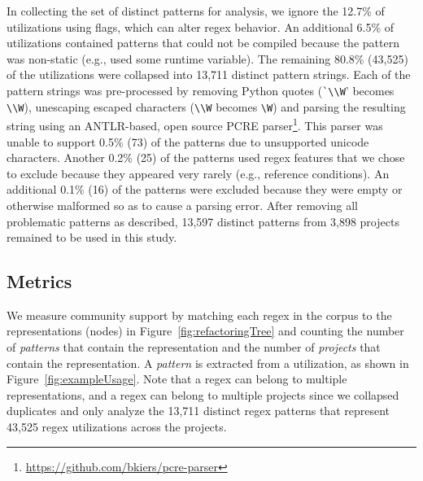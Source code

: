 In collecting the set of distinct patterns for analysis,  we ignore the 12.7\%  of utilizations using flags, which can alter regex behavior.  An additional 6.5\% of utilizations contained patterns that could not be compiled because the pattern was non-static (e.g., used some runtime variable).
The remaining 80.8\% (43,525) of the utilizations were collapsed into 13,711 distinct pattern strings.  Each of the pattern strings was pre-processed by removing Python quotes (\verb!`\\W!' becomes \verb!\\W!), unescaping escaped characters (\verb!\\W! becomes \verb!\W!) and parsing the resulting  string using an ANTLR-based, open source PCRE parser\footnote{\url{https://github.com/bkiers/pcre-parser}}.
This parser was unable to support 0.5\% (73) of the patterns due to unsupported unicode characters.  Another 0.2\% (25) of the patterns used regex features that we  chose to exclude because they appeared very rarely (e.g., reference conditions).  An additional 0.1\% (16) of the patterns were excluded because they were empty or otherwise malformed so as to cause a parsing error.  After removing all problematic patterns as described, 13,597 distinct patterns from 3,898 projects remained to be used in this study.



\subsection{Metrics}
\label{sec:communitymetric}
We measure community support by matching each regex in the corpus to the representations (nodes) in Figure~\ref{fig:refactoringTree} and counting the number of \emph{patterns} that contain the representation and the number of \emph{projects} that contain the representation.  
A \emph{pattern} is extracted from a utilization, as shown in Figure~\ref{fig:exampleUsage}. 
Note that a regex can belong to multiple representations, and a regex can belong to multiple projects since we collapsed duplicates and only analyze the 13,711 distinct regex patterns that represent 43,525 regex utilizations across the projects. 
%
%



